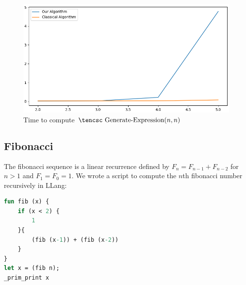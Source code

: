 \documentclass{llncs}
\begin{document}
\begin{figure}

    \centerline{\includegraphics[width=\hsize]{../Docs/Images/expr.png}}
    \caption{Time to compute $\hbox{\tencsc Generate-Expression}(n,n)$}
    \label{fig:expr}

\end{figure}

\subsection{Fibonacci}

The fibonacci sequence is a linear recurrence defined by $F_n=F_{n-1}+F_{n-2}$ for $n>1$ and $F_1=F_0=1$.
We wrote a script to compute the $n$th fibonacci number recursively in LLang:

\begin{lstlisting}[language=Caml, frame=single]
fun fib (x) {
    if (x < 2) {
        1
    }{
        (fib (x-1)) + (fib (x-2))
    }
}
let x = (fib n);
_prim_print x
\end{lstlisting}
\end{document}

